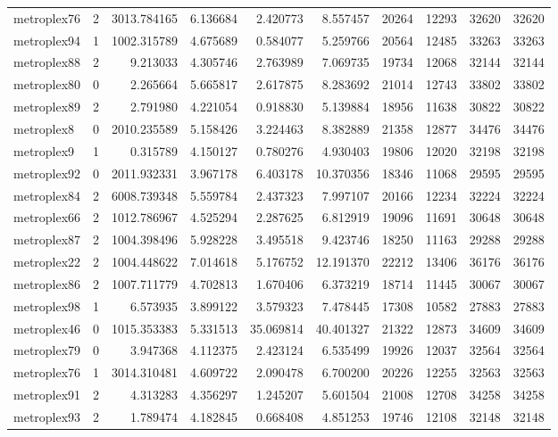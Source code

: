 \begin{longtable}{|l|r|r|r|r|r|r|r|r|r|}
metroplex76 & 2 & 3013.784165 & 6.136684 & 2.420773 & 8.557457 & 20264 & 12293 & 32620 & 32620 \\
metroplex94 & 1 & 1002.315789 & 4.675689 & 0.584077 & 5.259766 & 20564 & 12485 & 33263 & 33263 \\
metroplex88 & 2 & 9.213033 & 4.305746 & 2.763989 & 7.069735 & 19734 & 12068 & 32144 & 32144 \\
metroplex80 & 0 & 2.265664 & 5.665817 & 2.617875 & 8.283692 & 21014 & 12743 & 33802 & 33802 \\
metroplex89 & 2 & 2.791980 & 4.221054 & 0.918830 & 5.139884 & 18956 & 11638 & 30822 & 30822 \\
metroplex8 & 0 & 2010.235589 & 5.158426 & 3.224463 & 8.382889 & 21358 & 12877 & 34476 & 34476 \\
metroplex9 & 1 & 0.315789 & 4.150127 & 0.780276 & 4.930403 & 19806 & 12020 & 32198 & 32198 \\
metroplex92 & 0 & 2011.932331 & 3.967178 & 6.403178 & 10.370356 & 18346 & 11068 & 29595 & 29595 \\
metroplex84 & 2 & 6008.739348 & 5.559784 & 2.437323 & 7.997107 & 20166 & 12234 & 32224 & 32224 \\
metroplex66 & 2 & 1012.786967 & 4.525294 & 2.287625 & 6.812919 & 19096 & 11691 & 30648 & 30648 \\
metroplex87 & 2 & 1004.398496 & 5.928228 & 3.495518 & 9.423746 & 18250 & 11163 & 29288 & 29288 \\
metroplex22 & 2 & 1004.448622 & 7.014618 & 5.176752 & 12.191370 & 22212 & 13406 & 36176 & 36176 \\
metroplex86 & 2 & 1007.711779 & 4.702813 & 1.670406 & 6.373219 & 18714 & 11445 & 30067 & 30067 \\
metroplex98 & 1 & 6.573935 & 3.899122 & 3.579323 & 7.478445 & 17308 & 10582 & 27883 & 27883 \\
metroplex46 & 0 & 1015.353383 & 5.331513 & 35.069814 & 40.401327 & 21322 & 12873 & 34609 & 34609 \\
metroplex79 & 0 & 3.947368 & 4.112375 & 2.423124 & 6.535499 & 19926 & 12037 & 32564 & 32564 \\
metroplex76 & 1 & 3014.310481 & 4.609722 & 2.090478 & 6.700200 & 20226 & 12255 & 32563 & 32563 \\
metroplex91 & 2 & 4.313283 & 4.356297 & 1.245207 & 5.601504 & 21008 & 12708 & 34258 & 34258 \\
metroplex93 & 2 & 1.789474 & 4.182845 & 0.668408 & 4.851253 & 19746 & 12108 & 32148 & 32148 \\

\end{longtable}
